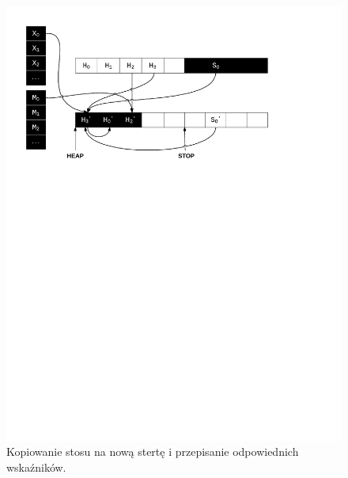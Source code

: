 \begin{figure}[p]
\centerline{\includegraphics[scale=0.75, clip, trim=10mm 180mm 45mm 10mm]{gc_5}}
\caption{Kopiowanie stosu na nową stertę i przepisanie odpowiednich wskaźników.}
\label{fig:gc5}
\end{figure}

